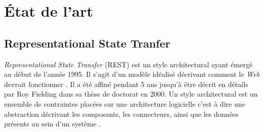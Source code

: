 \documentclass[a4paper, 11pt]{report}
\begin{document}
\chapter{État de l'art}

\section{Representational State Tranfer}

\emph{Representational State Transfer} (REST) est un style
architectural ayant émergé au début de l'année 1995.  Il s'agit d'un
modèle idéalisé décrivant comment le \emph{Web} devrait fonctionner
\cite{fielding2002principled}.  Il a été affiné pendant 5 ans jusqu'à
être décrit en détails par Roy Fielding dans sa thèse de doctorat
\cite{fielding2000architectural} en 2000.  Un style architectural est
un ensemble de contraintes placées sur une architecture logicielle
c'est à dire une abstraction décrivant les composants, les
connecteurs, ainsi que les données présents au sein d'un système
\cite{perry1992foundations}.
\end{document}
